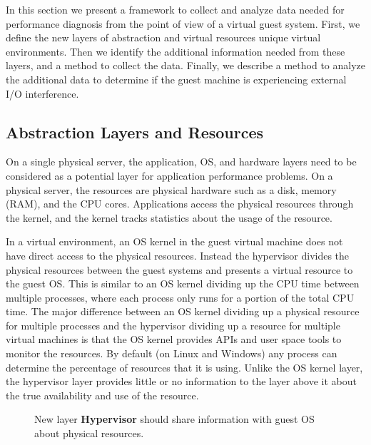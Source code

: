 In this section we present a framework to collect and analyze data needed for performance diagnosis from the point of view of a virtual guest system. 
First, we define the new layers of abstraction and virtual resources unique virtual environments.  
Then we identify the additional information needed from these layers, and a method to collect the data.
Finally, we describe a method to analyze the additional data to determine if the guest machine is experiencing external I/O interference.

\subsection{Abstraction Layers and Resources}
On a single physical server, the application, OS, and hardware layers need to be considered as a potential layer for application performance problems.  On a physical server, the resources are physical hardware such as a disk, memory (RAM), and the CPU cores.  Applications access the physical resources through the kernel, and the kernel tracks statistics about the usage of the resource.


In a virtual environment, an OS kernel in the guest virtual machine does not have direct access to the physical resources.  Instead the hypervisor divides the physical resources between the guest systems and presents a virtual resource to the guest OS.  
This is similar to an OS kernel dividing up the CPU time between multiple processes, where each process only runs for a portion of the total CPU time.  
The major difference between an OS kernel dividing up a physical resource for multiple processes and the hypervisor dividing up a resource for multiple virtual machines is that the OS kernel provides APIs and user space tools to monitor the resources.  By default (on Linux and Windows) any process can determine the percentage of resources that it is using.  Unlike the OS kernel layer, the hypervisor layer provides little or no information to the layer above it about the true availability and use of the resource.


\begin{figure}[!h]
  \begin{center}
  \caption{New layer \textbf{Hypervisor} should share information with guest OS about physical resources.}
  \label{LayersAndResources}
  \end{center}
\end{figure}


